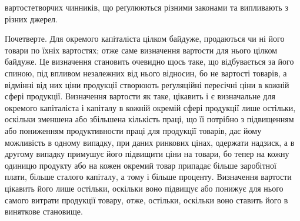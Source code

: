 \parcont{}  %
вартостетворчих чинників, що реґулюються різними законами та випливають
з різних джерел.

Почетверте. Для окремого капіталіста цілком байдуже, продаються чи
ні його товари по їхніх вартостях; отже саме визначення вартости для нього
цілком байдуже. Це визначення становить очевидно щось таке, що відбувається
за його спиною, під впливом незалежних від нього відносин, бо не вартості
товарів, а відмінні від них ціни продукції створюють реґуляційні пересічні
ціни в кожній сфері продукції. Визначення вартости як таке, цікавить і є визначальне
для окремого капіталіста і капіталу в кожній окремій сфері продукції лише
остільки, оскільки зменшена або збільшена кількість праці, що її потрібно з підвищенням
або пониженням продуктивности праці для продукції товарів, дає йому можливість
в одному випадку, при даних ринкових цінах, одержати надзиск, а в другому
випадку примушує його підвищити ціни на товари, бо тепер на кожну одиницю
продукту або на кожен окремий товар припадає більше заробітної плати, більше
сталого капіталу, а тому і більше проценту. Визначення вартости цікавить
його лише остільки, оскільки воно підвищує або понижує для нього самого
витрати продукції товару, отже, остільки, оскільки воно ставить його в виняткове
становище.


